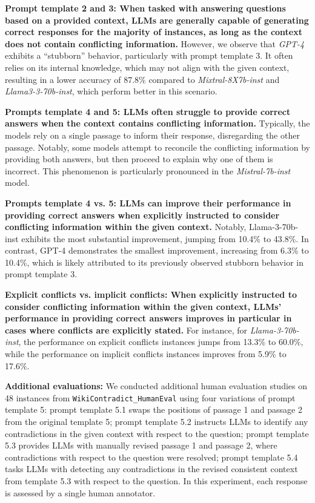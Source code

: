 \textbf{Prompt template 2 and 3: When tasked with answering questions based on a provided context, LLMs are generally capable of generating correct responses for the majority of instances, as long as the context does not contain conflicting information.} However, we observe that \emph{GPT-4} exhibits a ``stubborn'' behavior, particularly with prompt template 3. It often relies on its internal knowledge, which may not align with the given context, resulting in a lower accuracy of 87.8\% compared to \emph{Mixtral-8X7b-inst} and \emph{Llama3-3-70b-inst}, which perform better in this scenario.

\textbf{Prompts template 4 and 5: LLMs often struggle to provide correct answers when the context contains conflicting information.} Typically, the models rely on a single passage to inform their response, disregarding the other passage. Notably, some models attempt to reconcile the conflicting information by providing both answers, but then proceed to explain why one of them is incorrect. This phenomenon is particularly pronounced in the \emph{Mistral-7b-inst} model.

\textbf{Prompts template 4 vs. 5: LLMs can improve their performance in providing correct answers when explicitly instructed to consider conflicting information within the given context.} Notably, Llama-3-70b-inst exhibits the most substantial improvement, jumping from 10.4\% to 43.8\%. In contrast, GPT-4 demonstrates the smallest improvement, increasing from 6.3\% to 10.4\%, which is likely attributed to its previously observed stubborn behavior in prompt template 3.

\textbf{Explicit conflicts vs. implicit conflicts: When explicitly instructed to consider conflicting information within the given context, LLMs' performance in providing correct answers improves in particular %
in cases where conflicts are explicitly stated.} For instance, for \emph{Llama-3-70b-inst}, the performance on explicit conflicts instances jumps from 13.3\% to 60.0\%, while the performance on implicit conflicts instances improves from 5.9\% to 17.6\%.

\textbf{Additional evaluations: }We conducted additional human evaluation studies on 48 instances from \texttt{WikiContradict\_HumanEval} using four variations of prompt template 5: prompt template 5.1 swaps the positions of passage 1 and passage 2 from the original template 5; prompt template 5.2 instructs LLMs to identify any contradictions in the given context with respect to the question; prompt template 5.3 provides LLMs with manually revised passage 1 and passage 2, where contradictions with respect to the question were resolved; prompt template 5.4 tasks LLMs with detecting any contradictions in the revised consistent context from template 5.3 with respect to the question. In this experiment, each response is assessed by a single human annotator.

